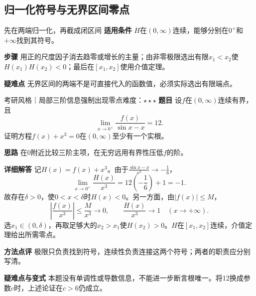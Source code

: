 \subsection{归一化符号与无界区间零点}
\begin{method}{先在两端归一化，再截成闭区间}
\textbf{适用条件} $H$在$(0,\infty)$连续，能够分别在$0^+$和$+\infty$找到其符号。\par
\textbf{步骤} 用正的尺度因子消去趋零或增长的主量；由非零极限选出有限$x_1<x_2$使$H(x_1)H(x_2)<0$；最后在$[x_1,x_2]$使用介值定理。\par
\textbf{疑难点} 无界区间的两端不是可直接代入的函数值，必须实际选出有限端点。
\end{method}
\begin{example}{考研风格｜局部三阶信息强制出现零点}{难度：$\star\star\star$}\label{cd:ex:unbounded-root}
\textbf{题目} 设$f$在$(0,\infty)$连续有界，且
\[
 \lim_{x\to0^+}\dfrac{f(x)}{\sin x-x}=12.
\]
证明方程$f(x)+x^3=0$在$(0,\infty)$至少有一个实根。\par
\textbf{思路} 在0附近比较三阶主项，在无穷远用有界性压低$f$的阶。\par
\textbf{详细解答} 记$H(x)=f(x)+x^3$。由于$\frac{\sin x-x}{x^3}\to-\frac{1}{6}$，
\[
 \lim_{x\to0^+}\dfrac{H(x)}{x^3}
 =12\left(-\dfrac16\right)+1=-1.
\]
故存在$\delta>0$，使$0<x<\delta$时$H(x)<0$。另一方面，由$|f(x)|\le M$，
\[
 \left|\dfrac{f(x)}{x^3}\right|\le\dfrac{M}{x^3}\to0,
 \qquad \dfrac{H(x)}{x^3}\to1\quad(x\to+\infty).
\]
选$x_1\in(0,\delta)$，再取足够大的$x_2>x_1$使$H(x_2)>0$。$H$在$[x_1,x_2]$连续，介值定理给出所需零点。\par
\textbf{方法点评} 极限只负责找到符号，连续性负责连接这两个符号；两者的职责应分别写清。\par
\textbf{疑难点与变式} 本题没有单调性或导数信息，不能进一步断言根唯一。将12换成参数$c$时，上述论证在$c>6$仍成立。
\end{example}

